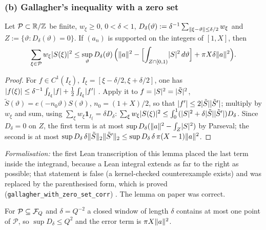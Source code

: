 \subsubsection*{(b) Gallagher's inequality with a zero set}
\begin{lemma}[Lemma K.2]\label{lem:K-G}
Let $\mathcal P\subset\mathbb R/\mathbb Z$ be finite, $w_\xi\ge0$, $0<\delta<1$, $D_\delta(\vartheta):=\delta^{-1}\sum_{\lVert \xi-\vartheta\rVert\le\delta/2}w_\xi$ and
$Z:=\{\vartheta:D_\delta(\vartheta)=0\}$. If $(a_n)$ is supported on the integers of $[1,X]$, then
\[
\sum_{\xi\in\mathcal P}w_\xi\lvert S(\xi)\rvert^2\le\sup_\vartheta D_\delta(\vartheta)\,\Bigl(\lVert a\rVert^2-\Bigl[\int_{Z\cap[0,1)}\lvert S\rvert^2\,d\vartheta\Bigr]+\pi X\delta\lVert a\rVert^2\Bigr).
\]
\end{lemma}
\begin{proof}
For $f\in C^1(I_\xi)$, $I_\xi=[\xi-\delta/2,\xi+\delta/2]$, one has $\lvert f(\xi)\rvert\le\delta^{-1}\int_{I_\xi}\lvert f\rvert+\frac12\int_{I_\xi}\lvert f'\rvert$
\cite[Lemma~1]{Mont78}. Apply it to $f=\lvert S\rvert^2=\lvert \tilde S\rvert^2$, $\tilde S(\vartheta)=e(-n_0\vartheta)S(\vartheta)$, $n_0=(1+X)/2$, so that
$\lvert f'\rvert\le2\lvert \tilde S\rvert\lvert \tilde S'\rvert$; multiply by $w_\xi$ and sum, using $\sum_\xi w_\xi\mathbf 1_{I_\xi}=\delta D_\delta$:
$\sum_\xi w_\xi\lvert S(\xi)\rvert^2\le\int_0^1(\lvert S\rvert^2+\delta\lvert \tilde S\rvert\lvert \tilde S'\rvert)D_\delta$. Since $D_\delta=0$ on $Z$, the first term is at most
$\sup D_\delta(\lVert a\rVert^2-\int_Z\lvert S\rvert^2)$ by Parseval; the second is at most $\sup D_\delta\,\delta\lVert \tilde S\rVert_2\lVert \tilde S'\rVert_2
\le\sup D_\delta\,\delta\,\pi(X-1)\lVert a\rVert^2$.
\end{proof}
\emph{Formalisation:} the first Lean transcription of this
lemma placed the last term inside the integrand, because a Lean integral extends as far to the right as possible; that statement is
false (a kernel-checked counterexample exists) and was replaced by the parenthesised form, which is proved
(\texttt{gallagher\_with\_zero\_set\_corr}) \tagL. The lemma on paper was correct.

For $\mathcal P\subseteq\mathcal F_Q$ and $\delta=Q^{-2}$ a closed window of length $\delta$ contains at most one point of $\mathcal P$, so
$\sup D_\delta\le Q^2$ and the error term is $\pi X\lVert a\rVert^2$.


